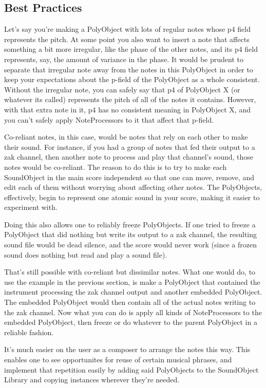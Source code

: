 \subsection{Best Practices}

Let's say you're making a PolyObject with lots of regular notes whose p4
field represents the pitch. At some point you also want to insert a note
that affects something a bit more irregular, like the phase of the other
notes, and its p4 field represents, say, the amount of variance in the
phase. It would be prudent to separate that irregular note away from the
notes in this PolyObject in order to keep your expectations about the
p-field of the PolyObject as a whole consistent. Without the irregular
note, you can safely say that p4 of PolyObject X (or whatever its
called) represents the pitch of all of the notes it contains. However,
with that extra note in it, p4 has no consistent meaning in PolyObject
X, and you can't safely apply NoteProcessors to it that affect that
p-field.

Co-reliant notes, in this case, would be notes that rely on each other
to make their sound. For instance, if you had a group of notes that fed
their output to a zak channel, then another note to process and play
that channel's sound, those notes would be co-reliant. The reason to do
this is to try to make each SoundObject in the main score independent so
that one can move, remove, and edit each of them without worrying about
affecting other notes. The PolyObjects, effectively, begin to represent
one atomic sound in your score, making it easier to experiment with.

Doing this also allows one to reliably freeze PolyObjects. If one tried
to freeze a PolyObject that did nothing but write its output to a zak
channel, the resulting sound file would be dead silence, and the score
would never work (since a frozen sound does nothing but read and play a
sound file).

That's still possible with co-reliant but dissimilar notes. What one
would do, to use the example in the previous section, is make a
PolyObject that contained the instrument processing the zak channel
output and another embedded PolyObject. The embedded PolyObject would
then contain all of the actual notes writing to the zak channel. Now
what you can do is apply all kinds of NoteProcessors to the embedded
PolyObject, then freeze or do whatever to the parent PolyObject in a
reliable fashion.

It's much easier on the user as a composer to arrange the notes this
way. This enables one to see opportunites for reuse of certain musical
phrases, and implement that repetition easily by adding said PolyObjects
to the SoundObject Library and copying instances wherever they're
needed.

